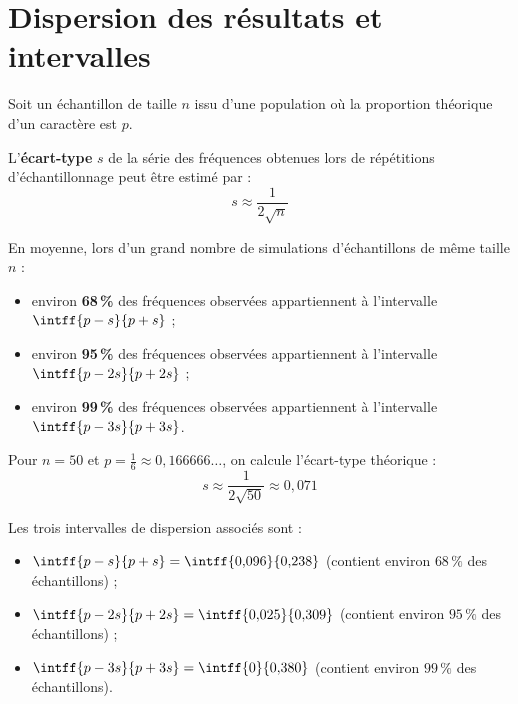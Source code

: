 \section{Dispersion des résultats et intervalles}

\begin{prop}
	Soit un échantillon de taille $n$ issu d'une population où la proportion théorique d'un caractère est $p$.

	L'\textbf{écart-type} $s$ de la série des fréquences obtenues lors de répétitions d'échantillonnage peut être estimé par :
	\[
		s \approx \dfrac{1}{2\sqrt{n}}
	\]

	En moyenne, lors d'un grand nombre de simulations d'échantillons de même taille $n$ :
	\begin{itemize}
		\item environ \textbf{68\,\%} des fréquences observées appartiennent à l'intervalle $\intff{p - s}{p + s}$ ;
		\item environ \textbf{95\,\%} des fréquences observées appartiennent à l'intervalle $\intff{p - 2s}{p + 2s}$ ;
		\item environ \textbf{99\,\%} des fréquences observées appartiennent à l'intervalle $\intff{p - 3s}{p + 3s}$.
	\end{itemize}
\end{prop}

\begin{ex}
	Pour $n = 50$ et $p = \frac{1}{6} \approx 0{,}166666\ldots$, on calcule l'écart-type théorique :
	\[
		s \approx \dfrac{1}{2\sqrt{50}} \approx 0{,}071
	\]

	Les trois intervalles de dispersion associés sont :
	\begin{itemize}
		\item $\intff{p - s}{p + s} = \intff{0{,}096}{0{,}238}$ (contient environ $68\,\%$ des échantillons) ;
		\item $\intff{p - 2s}{p + 2s} = \intff{0{,}025}{0{,}309}$ (contient environ $95\,\%$ des échantillons) ;
		\item $\intff{p - 3s}{p + 3s} = \intff{0}{0{,}380}$ (contient environ $99\,\%$ des échantillons).
	\end{itemize}
\end{ex}

\newpage

